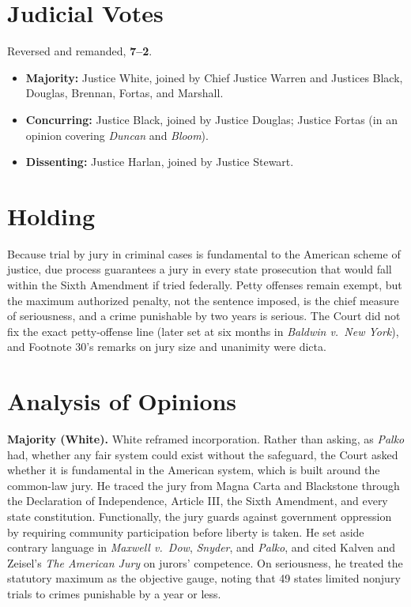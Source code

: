 \documentclass[12pt]{article}
\begin{document}
\section{Judicial Votes}

Reversed and remanded, \textbf{7--2}.
\begin{itemize}
\item \textbf{Majority:} Justice White, joined by Chief Justice Warren and Justices Black, Douglas, Brennan, Fortas, and Marshall.
\item \textbf{Concurring:} Justice Black, joined by Justice Douglas; Justice Fortas (in an opinion covering \textit{Duncan} and \textit{Bloom}).
\item \textbf{Dissenting:} Justice Harlan, joined by Justice Stewart.
\end{itemize}

\section{Holding}

Because trial by jury in criminal cases is fundamental to the American scheme of justice, due process guarantees a jury in every state prosecution that would fall within the Sixth Amendment if tried federally. Petty offenses remain exempt, but the maximum authorized penalty, not the sentence imposed, is the chief measure of seriousness, and a crime punishable by two years is serious. The Court did not fix the exact petty-offense line (later set at six months in \textit{Baldwin v.\ New York}), and Footnote 30's remarks on jury size and unanimity were dicta.

\section{Analysis of Opinions}

\textbf{Majority (White).} White reframed incorporation. Rather than asking, as \textit{Palko} had, whether any fair system could exist without the safeguard, the Court asked whether it is fundamental in the American system, which is built around the common-law jury. He traced the jury from Magna Carta and Blackstone through the Declaration of Independence, Article III, the Sixth Amendment, and every state constitution. Functionally, the jury guards against government oppression by requiring community participation before liberty is taken. He set aside contrary language in \textit{Maxwell v.\ Dow}, \textit{Snyder}, and \textit{Palko}, and cited Kalven and Zeisel's \textit{The American Jury} on jurors' competence. On seriousness, he treated the statutory maximum as the objective gauge, noting that 49 states limited nonjury trials to crimes punishable by a year or less.
\end{document}
